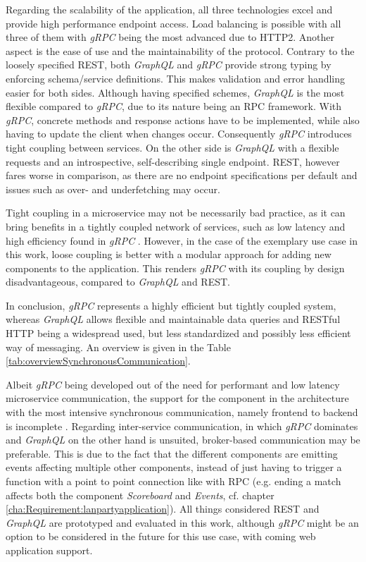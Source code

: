 Regarding the scalability of the application, all three technologies excel and provide high performance endpoint access.
Load balancing is possible with all three of them with \textit{gRPC} being the most advanced due to HTTP2.
Another aspect is the ease of use and the maintainability of the protocol.
Contrary to the loosely specified \ac{REST}, both \textit{GraphQL} and \textit{gRPC} provide strong typing by enforcing schema/service definitions.
This makes validation and error handling easier for both sides.
Although having specified schemes, \textit{GraphQL} is the most flexible compared to \textit{gRPC}, due to its nature being an \ac{RPC} framework.
With \textit{gRPC}, concrete methods and response actions have to be implemented, while also having to update the client when changes occur.
Consequently \textit{gRPC} introduces tight coupling between services.
On the other side is \textit{GraphQL} with a flexible requests and an introspective, self-describing single endpoint.
\ac{REST}, however fares worse in comparison, as there are no endpoint specifications per default and issues such as over- and underfetching may occur.

Tight coupling in a microservice may not be necessarily bad practice, as it can bring benefits in a tightly coupled network of services, such as low latency and high efficiency found in \textit{gRPC} \cite{Esposito.2019}.
However, in the case of the exemplary use case in this work, loose coupling is better with a modular approach for adding new components to the application.
This renders \textit{gRPC} with its coupling by design disadvantageous, compared to \textit{GraphQL} and \ac{REST}.

In conclusion, \textit{gRPC} represents a highly efficient but tightly coupled system, whereas \textit{GraphQL} allows flexible and maintainable data queries and RESTful \ac{HTTP} being a widespread used, but less standardized and possibly less efficient way of messaging.
An overview is given in the Table \ref{tab:overviewSynchronousCommunication}.

Albeit \textit{gRPC} being developed out of the need for performant and low latency microservice communication, the support for the component in the architecture with the most intensive synchronous communication, namely frontend to backend is incomplete \cite{gRPCAuthors.01.06.2020}.
Regarding inter-service communication, in which \textit{gRPC} dominates and \textit{GraphQL} on the other hand is unsuited, broker-based communication may be preferable.
This is due to the fact that the different components are emitting events affecting multiple other components, instead of just having to trigger a function with a point to point connection like with \ac{RPC} (e.g. ending a match affects both the component \textit{Scoreboard} and \textit{Events}, cf. chapter \ref{cha:Requirement:lanpartyapplication}).
All things considered \ac{REST} and \textit{GraphQL} are prototyped and evaluated in this work, although \textit{gRPC} might be an option to be considered in the future for this use case, with coming web application support.


